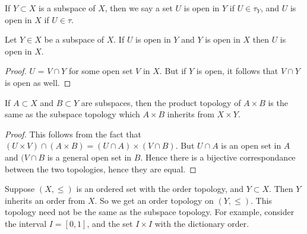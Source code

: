 \begin{definition}
If $Y \subset X$ is a subspace of $X$, then we say a set $U$ is open in $Y$ if $U \in \tau_Y$, and $U$ is open in $X$ if $U \in \tau$.
\end{definition}

\begin{proposition}
Let $Y \in X$ be a subspace of $X$. If $U$ is open in $Y$ and $Y$ is open in $X$ then $U$ is open in $X$.
\end{proposition}
\begin{proof}
$U$ = $V \cap Y$ for some open set $V$ in $X$. But if $Y$ is open, it follows that $V \cap Y$ is open as well.
\end{proof}

\begin{theorem}
If $A \subset X$ and $B \subset Y$ are subspaces, then the product topology of $A \times B$ is the same as the subspace topology which $A \times B$ inherits from $X \times Y$.
\end{theorem}
\begin{proof}
This follows from the fact that $(U \times V) \cap (A \times B) = (U \cap A) \times (V \cap B)$. But $U \cap A$ is an open set in $A$ and $(V \cap B$ is a general open set in $B$. Hence there is a bijective correspondance between the two topologies, hence they are equal.
\end{proof}

\begin{example}
Suppose $(X, \leq)$ is an ordered set with the order topology, and $Y \subset X$. Then $Y$ inherits an order from $X$. So we get an order topology on $(Y, \leq)$. This topology need not be the same as the subspace topology. For example, consider the interval $I = [0,1]$, and the set $I \times I$ with the dictionary order. %
\end{example}